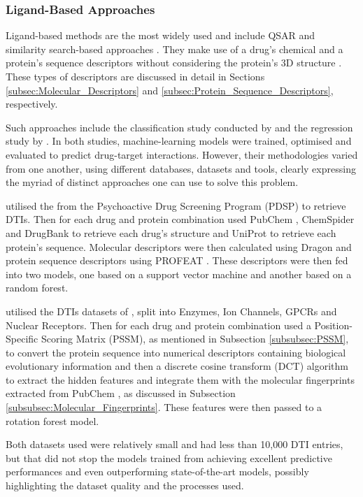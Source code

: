 \subsubsection{Ligand-Based Approaches}

Ligand-based methods are the most widely used and include QSAR and similarity search-based approaches \citep{Acharya2011}. They make use of a drug's chemical and a protein's sequence descriptors without considering the protein's 3D structure \citep{Aparoy2012}. These types of descriptors are discussed in detail in Sections \ref{subsec:Molecular_Descriptors} and \ref{subsec:Protein_Sequence_Descriptors}, respectively.

Such approaches include the classification study conducted by \citet{Wang2020} and the regression study by \cite{Shar2016}. In both studies, machine-learning models were trained, optimised and evaluated to predict drug-target interactions. However, their methodologies varied from one another, using different databases, datasets and tools, clearly expressing the myriad of distinct approaches one can use to solve this problem.

\citet{Shar2016} utilised the \citet{Ki_Database} from the Psychoactive Drug Screening Program (PDSP) \citep{Ki_Database_Paper} to retrieve DTIs. Then for each drug and protein combination used PubChem \citep{PubChem}, ChemSpider \citep{ChemSpider} and DrugBank \citep{DrugBank} to retrieve each drug's structure and UniProt \citep{UniProt_Paper} to retrieve each protein's sequence. Molecular descriptors were then calculated using Dragon \citep{DRAGON} and protein sequence descriptors using PROFEAT \citep{PROFEAT}. These descriptors were then fed into two models, one based on a support vector machine and another based on a random forest. 

\citet{Wang2020} utilised the DTIs datasets of \citet{Yamanishi2008}, split into Enzymes, Ion Channels, GPCRs and Nuclear Receptors. Then for each drug and protein combination used a Position-Specific Scoring Matrix (PSSM), as mentioned in Subsection \ref{subsubsec:PSSM}, to convert the protein sequence into numerical descriptors containing biological evolutionary information and then a discrete cosine transform (DCT) algorithm to extract the hidden features and integrate them with the molecular fingerprints extracted from PubChem \citep{PubChem}, as discussed in Subsection \ref{subsubsec:Molecular_Fingerprints}. These features were then passed to a rotation forest model. 

Both datasets used were relatively small and had less than 10,000 DTI entries, but that did not stop the models trained from achieving excellent predictive performances and even outperforming state-of-the-art models, possibly highlighting the dataset quality and the processes used.

